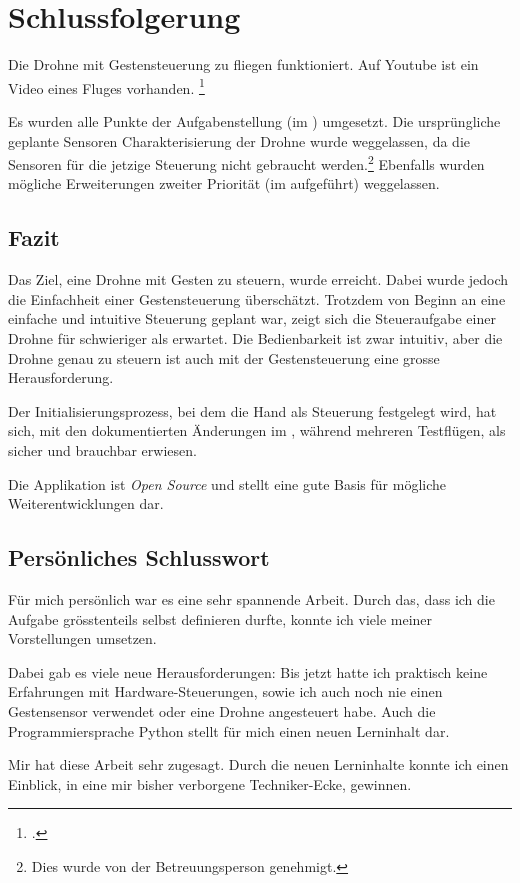 \chapter{Schlussfolgerung}
Die Drohne mit Gestensteuerung zu fliegen funktioniert.
Auf Youtube ist ein Video eines Fluges vorhanden.
\footcite{Crazyflie_20_with_Leap_Motion_Gesture_controlled_YouTube_2015-09-04}

Es wurden alle Punkte der Aufgabenstellung (im ) umgesetzt. Die ursprüngliche geplante Sensoren Charakterisierung der Drohne wurde weggelassen, da die Sensoren für die jetzige Steuerung nicht gebraucht werden.\footnote{Dies wurde von der Betreuungsperson genehmigt.}
Ebenfalls wurden mögliche Erweiterungen zweiter Priorität (im  aufgeführt) weggelassen.

\section{Fazit}
Das Ziel, eine Drohne mit Gesten zu steuern, wurde erreicht.
Dabei wurde jedoch die Einfachheit einer Gestensteuerung überschätzt.
Trotzdem von Beginn an eine einfache und intuitive Steuerung geplant war, zeigt sich die Steueraufgabe einer Drohne für schwieriger als erwartet.
Die Bedienbarkeit ist zwar intuitiv, aber die Drohne genau zu steuern ist auch mit der Gestensteuerung eine grosse Herausforderung.

Der Initialisierungsprozess, bei dem die Hand als Steuerung festgelegt wird, hat sich, mit den dokumentierten Änderungen im , während mehreren Testflügen, als sicher und brauchbar erwiesen.

Die Applikation ist \textit{Open Source} und stellt eine gute Basis für mögliche Weiterentwicklungen dar.


\section{Persönliches Schlusswort}
Für mich persönlich war es eine sehr spannende Arbeit.
Durch das, dass ich die Aufgabe grösstenteils selbst definieren durfte, konnte ich viele meiner Vorstellungen umsetzen.

Dabei gab es viele neue Herausforderungen:
Bis jetzt hatte ich praktisch keine Erfahrungen mit Hardware-Steuerungen, sowie ich auch noch nie einen Gestensensor verwendet oder eine Drohne angesteuert habe.
Auch die Programmiersprache Python stellt für mich einen neuen Lerninhalt dar.

Mir hat diese Arbeit sehr zugesagt.
Durch die neuen Lerninhalte konnte ich einen Einblick, in eine mir bisher verborgene Techniker-Ecke, gewinnen.

